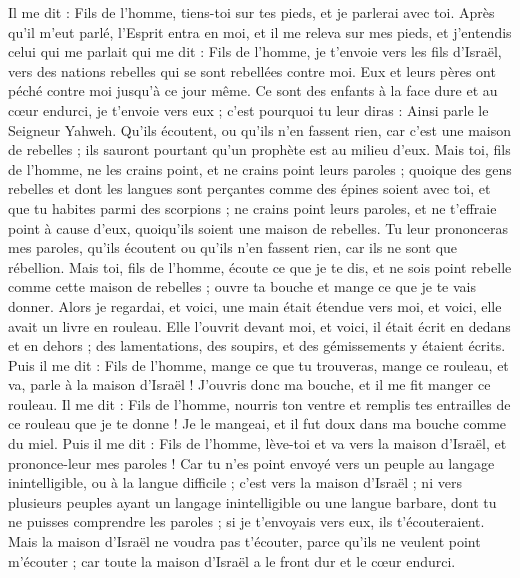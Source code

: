 \begin{multicols}{2}
\VerseOne{}Il me dit : Fils de l’homme, tiens-toi sur tes pieds, et je parlerai avec toi.
Après qu’il m’eut parlé, l'Esprit entra en moi, et il me releva sur mes pieds, et j'entendis celui qui me parlait
qui me dit : Fils de l’homme, je t'envoie vers les fils d'Israël, vers des nations rebelles qui se sont rebellées contre moi. Eux et leurs pères ont péché contre moi jusqu’à ce jour même.
Ce sont des enfants à la face dure et au cœur endurci, je t'envoie vers eux ; c'est pourquoi tu leur diras : Ainsi parle le Seigneur Yahweh.
Qu'ils écoutent, ou qu'ils n'en fassent rien, car c’est une maison de rebelles ; ils sauront pourtant qu'un prophète est au milieu d’eux.
Mais toi, fils de l’homme, ne les crains point, et ne crains point leurs paroles ; quoique des gens rebelles et dont les langues sont perçantes comme des épines soient avec toi, et que tu habites parmi des scorpions ; ne crains point leurs paroles, et ne t'effraie point à cause d'eux, quoiqu'ils soient une maison de rebelles.
Tu leur prononceras mes paroles, qu'ils écoutent ou qu'ils n'en fassent rien, car ils ne sont que rébellion.
Mais toi, fils de l’homme, écoute ce que je te dis, et ne sois point rebelle comme cette maison de rebelles ; ouvre ta bouche et mange ce que je te vais donner.
Alors je regardai, et voici, une main était étendue vers moi, et voici, elle avait un livre en rouleau.
Elle l'ouvrit devant moi, et voici, il était écrit en dedans et en dehors ; des lamentations, des soupirs, et des gémissements y étaient écrits.
\VerseOne{}Puis il me dit : Fils de l’homme, mange ce que tu trouveras, mange ce rouleau, et va, parle à la maison d'Israël !
J'ouvris donc ma bouche, et il me fit manger ce rouleau.
Il me dit : Fils de l’homme, nourris ton ventre et remplis tes entrailles de ce rouleau que je te donne ! Je le mangeai, et il fut doux dans ma bouche comme du miel.
Puis il me dit : Fils de l’homme, lève-toi et va vers la maison d'Israël, et prononce-leur mes paroles !
Car tu n'es point envoyé vers un peuple au langage inintelligible, ou à la langue difficile ; c'est vers la maison d'Israël ;
ni vers plusieurs peuples ayant un langage inintelligible ou une langue barbare, dont tu ne puisses comprendre les paroles ; si je t’envoyais vers eux, ils t'écouteraient.
Mais la maison d'Israël ne voudra pas t’écouter, parce qu'ils ne veulent point m’écouter ; car toute la maison d'Israël a le front dur et le cœur endurci.

\end{multicols}
